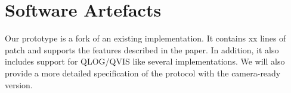%

\newpage 
\section*{Software Artefacts}

Our \tcpls prototype is a fork of an existing  implementation. It contains xx lines of patch and supports the features described in the paper. In addition, it also includes support for QLOG/QVIS \cite{marx2020debugging} like several \quic implementations. We will also provide a more detailed specification of the \tcpls protocol with the camera-ready version.




